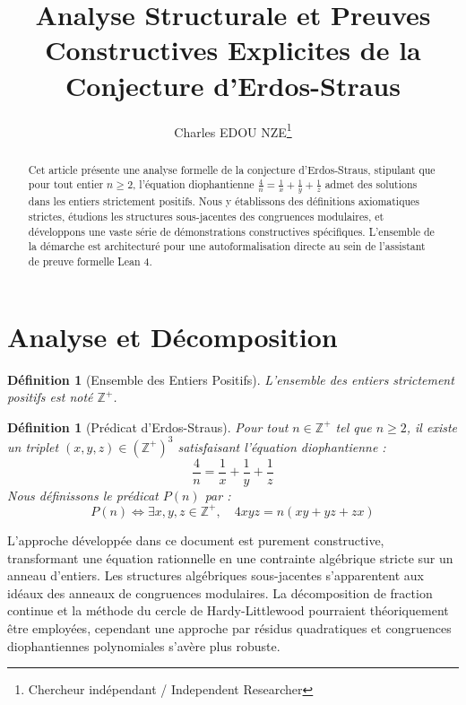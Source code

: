 \documentclass[11pt,a4paper]{article}
\title{Analyse Structurale et Preuves Constructives Explicites de la Conjecture d'Erdos-Straus}
\author{Charles EDOU NZE\thanks{Chercheur indépendant / Independent Researcher}}
\date{}
\newtheorem{definition}[theorem]{Définition}
\begin{document}
\maketitle

\begin{abstract}
Cet article présente une analyse formelle de la conjecture d'Erdos-Straus, stipulant que pour tout entier $n \geq 2$, l'équation diophantienne $\frac{4}{n} = \frac{1}{x} + \frac{1}{y} + \frac{1}{z}$ admet des solutions dans les entiers strictement positifs. Nous y établissons des définitions axiomatiques strictes, étudions les structures sous-jacentes des congruences modulaires, et développons une vaste série de démonstrations constructives spécifiques. L'ensemble de la démarche est architecturé pour une autoformalisation directe au sein de l'assistant de preuve formelle Lean 4.
\end{abstract}

\tableofcontents

\section{Analyse et Décomposition}

\begin{definition}[Ensemble des Entiers Positifs]
L'ensemble des entiers strictement positifs est noté $\mathbb{Z}^{+}$.
\end{definition}

\begin{definition}[Prédicat d'Erdos-Straus]
Pour tout $n \in \mathbb{Z}^{+}$ tel que $n \geq 2$, il existe un triplet $(x, y, z) \in (\mathbb{Z}^{+})^3$ satisfaisant l'équation diophantienne :
\begin{equation}
\frac{4}{n} = \frac{1}{x} + \frac{1}{y} + \frac{1}{z}
\label{eq:erdos}
\end{equation}
Nous définissons le prédicat $P(n)$ par :
$$ P(n) \iff \exists x, y, z \in \mathbb{Z}^{+}, \quad 4xyz = n(xy + yz + zx) $$
\end{definition}

L'approche développée dans ce document est purement constructive, transformant une équation rationnelle en une contrainte algébrique stricte sur un anneau d'entiers. Les structures algébriques sous-jacentes s'apparentent aux idéaux des anneaux de congruences modulaires. La décomposition de fraction continue et la méthode du cercle de Hardy-Littlewood pourraient théoriquement être employées, cependant une approche par résidus quadratiques et congruences diophantiennes polynomiales s'avère plus robuste.
\end{document}
